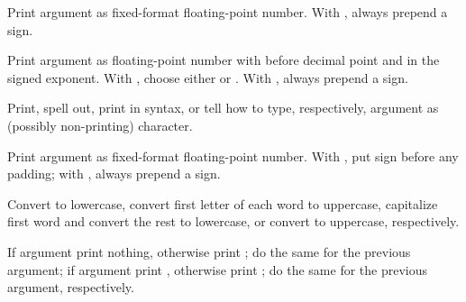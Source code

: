 \begin{LIST}{1cm}
\begin{LIST}{.5cm}
    {
    Print argument as fixed-format floating-point number. With
    , always prepend a sign. 
  }

    {
      Print argument as floating-point number with 
      before decimal point and  in the signed
      exponent. With , choose either  or
      . With , always prepend a sign. 
  }

    {
    Print, spell out, print in \kwd{\#$\backslash$} syntax, or tell
    how to type, respectively, argument as (possibly non-printing)
    character. 
  }

  {
  Print argument as fixed-format floating-point number. With \KWD{:},
  put sign before any padding; with , always prepend a sign.}

    {
    Convert to lowercase, convert first letter of each word to
    uppercase, capitalize first word and convert
    the rest to lowercase, or convert to uppercase, respectively.
  }

    {
    If argument   print nothing, otherwise print ;
    do the same for the previous argument; if argument  
    print , otherwise print ; do the same for the
    previous argument, respectively.  
  }


\end{LIST}
\end{LIST}
